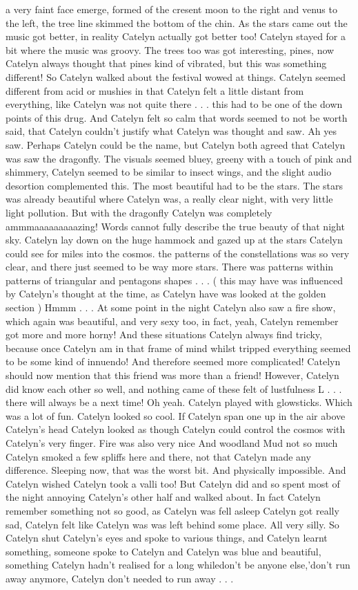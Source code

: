 \documentclass[12pt]{book}
\begin{document}
a very faint face emerge, formed of the cresent moon to the right and venus to the left, the tree line skimmed the bottom of the chin. As the stars came out the music got better, in reality Catelyn actually got better too! Catelyn stayed for a bit where the music was groovy. The trees too was got interesting, pines, now Catelyn always thought that pines kind of vibrated, but this was something different! So Catelyn walked about the festival wowed at things. Catelyn seemed different from acid or mushies in that Catelyn felt a little distant from everything, like Catelyn was not quite there . . .  this had to be one of the down points of this drug. And Catelyn felt so calm that words seemed to not be worth said, that Catelyn couldn't justify what Catelyn was thought and saw. Ah yes saw. Perhaps Catelyn could be the name, but Catelyn both agreed that Catelyn was saw the dragonfly. The visuals seemed bluey, greeny with a touch of pink and shimmery, Catelyn seemed to be similar to insect wings, and the slight audio desortion complemented this. The most beautiful had to be the stars. The stars was already beautiful where Catelyn was, a really clear night, with very little light pollution. But with the dragonfly Catelyn was completely ammmaaaaaaaaazing! Words cannot fully describe the true beauty of that night sky. Catelyn lay down on the huge hammock and gazed up at the stars Catelyn could see for miles into the cosmos. the patterns of the constellations was so very clear, and there just seemed to be way more stars. There was patterns within patterns of triangular and pentagons shapes . . .  ( this may have was influenced by Catelyn's thought at the time, as Catelyn have was looked at the golden section ) Hmmm . . .  At some point in the night Catelyn also saw a fire show, which again was beautiful, and very sexy too, in fact, yeah, Catelyn remember got more and more horny! And these situations Catelyn always find tricky, because once Catelyn am in that frame of mind whilst tripped everything seemed to be some kind of innuendo! And therefore seemed more complicated! Catelyn should now mention that this friend was more than a friend! However, Catelyn did know each other so well, and nothing came of these felt of lustfulness L  . . .  there will always be a next time! Oh yeah. Catelyn played with glowsticks. Which was a lot of fun. Catelyn looked so cool. If Catelyn span one up in the air above Catelyn's head Catelyn looked as though Catelyn could control the cosmos with Catelyn's very finger. Fire was also very nice And woodland Mud not so much Catelyn smoked a few spliffs here and there, not that Catelyn made any difference. Sleeping now, that was the worst bit. And physically impossible. And Catelyn wished Catelyn took a valli too! But Catelyn did and so spent most of the night annoying Catelyn's other half and walked about. In fact Catelyn remember something not so good, as Catelyn was fell asleep Catelyn got really sad, Catelyn felt like Catelyn was was left behind some place. All very silly. So Catelyn shut Catelyn's eyes and spoke to various things, and Catelyn learnt something, someone spoke to Catelyn and Catelyn was blue and beautiful, something Catelyn hadn't realised for a long whiledon't be anyone else,'don't run away anymore, Catelyn don't needed to run away . . .  
\end{document}
